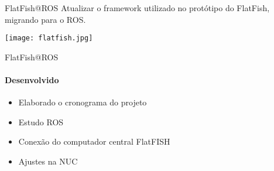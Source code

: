 \begin{frame}[c]{}
    \begin{center}
    \end{center}
\end{frame}
\begin{frame}[t]{FlatFish@ROS}
    Atualizar o framework utilizado no protótipo do FlatFish, migrando para o ROS.
    
    \begin{center}
    \texttt{[image: flatfish.jpg]}
    \end{center}
    
    
            
\end{frame}
\begin{frame}[t]{FlatFish@ROS}
    \framesubtitle{Desenvolvido}
    \begin{itemize}
        \item Elaborado o cronograma do projeto
        \item Estudo ROS
        \item Conexão do computador central FlatFISH
        \item Ajustes na NUC
    \end{itemize}    
\end{frame}

